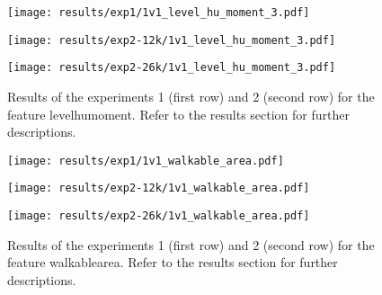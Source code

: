  
\begin{figure}[h!]
    \centering
	\begin{minipage}{0.3\linewidth}
		\texttt{[image: results/exp1/1v1\_level\_hu\_moment\_3.pdf]}
	\end{minipage}

	\begin{minipage}{0.3\linewidth}
		\texttt{[image: results/exp2-12k/1v1\_level\_hu\_moment\_3.pdf]}
	\end{minipage}
	\begin{minipage}{0.3\linewidth}
		\texttt{[image: results/exp2-26k/1v1\_level\_hu\_moment\_3.pdf]}
	\end{minipage}

	\caption[ Results: Feature level\textunderscore hu\textunderscore moment]{ Results of the experiments 1 (first row) and 2 (second row) for the feature level\textunderscore hu\textunderscore moment. Refer to the results section for further descriptions. }
	\label{fig:appendix_level_hu_moment_3}
\end{figure}
 
\begin{figure}[h!]
    \centering
	\begin{minipage}{0.3\linewidth}
		\texttt{[image: results/exp1/1v1\_walkable\_area.pdf]}
	\end{minipage}

	\begin{minipage}{0.3\linewidth}
		\texttt{[image: results/exp2-12k/1v1\_walkable\_area.pdf]}
	\end{minipage}
	\begin{minipage}{0.3\linewidth}
		\texttt{[image: results/exp2-26k/1v1\_walkable\_area.pdf]}
	\end{minipage}

	\caption[ Results: Feature walkable\textunderscore area]{ Results of the experiments 1 (first row) and 2 (second row) for the feature walkable\textunderscore area. Refer to the results section for further descriptions. }
	\label{fig:appendix_walkable_area}
\end{figure}
 \newpage 

